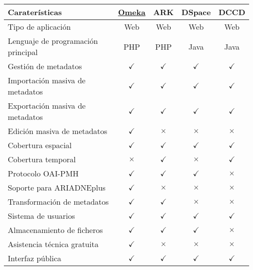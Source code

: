 \begin{table}[H]\label{tabla:comparativa}
\centering
\begin{tabular}{@{}lcccc@{}}
\toprule
Caraterísticas & \underline{Omeka} & ARK & DSpace & DCCD \tabularnewline
\midrule
Tipo de aplicación & Web & Web & Web & Web\tabularnewline
Lenguaje de programación principal & PHP & PHP & Java &
Java\tabularnewline
Gestión de metadatos & \cellcolor{green!25} {$\checkmark$} & \cellcolor{green!25} {$\checkmark$} & \cellcolor{green!25} {$\checkmark$} & \cellcolor{green!25} {$\checkmark$}\tabularnewline
Importación masiva de metadatos & \cellcolor{green!25} {$\checkmark$} & \cellcolor{green!25} {$\checkmark$} & \cellcolor{green!25} {$\checkmark$} & \cellcolor{green!25} {$\checkmark$}\tabularnewline
Exportación masiva de metadatos & \cellcolor{green!25} {$\checkmark$} & \cellcolor{green!25} {$\checkmark$} & \cellcolor{green!25} {$\checkmark$} & \cellcolor{green!25} {$\checkmark$}\tabularnewline
Edición masiva de metadatos & \cellcolor{green!25} {$\checkmark$} & \cellcolor{red!25} {$\times$} & \cellcolor{red!25} {$\times$} & \cellcolor{red!25} {$\times$}\tabularnewline
Cobertura espacial & \cellcolor{green!25} {$\checkmark$} & \cellcolor{green!25} {$\checkmark$} & \cellcolor{green!25} {$\checkmark$} & \cellcolor{green!25} {$\checkmark$}\tabularnewline
Cobertura temporal & \cellcolor{red!25} {$\times$} & \cellcolor{green!25} {$\checkmark$} & \cellcolor{red!25} {$\times$} & \cellcolor{green!25} {$\checkmark$}\tabularnewline
Protocolo OAI-PMH & \cellcolor{green!25} {$\checkmark$} & \cellcolor{green!25} {$\checkmark$} & \cellcolor{green!25} {$\checkmark$} & \cellcolor{red!25} {$\times$}\tabularnewline
Soporte para ARIADNEplus & \cellcolor{green!25} {$\checkmark$} & \cellcolor{red!25} {$\times$} & \cellcolor{red!25} {$\times$} &
\cellcolor{red!25} {$\times$}\tabularnewline
Transformación de metadatos & \cellcolor{green!25} {$\checkmark$} & \cellcolor{green!25} {$\checkmark$} & \cellcolor{red!25} {$\times$} &
\cellcolor{red!25} {$\times$}\tabularnewline
Sistema de usuarios & \cellcolor{green!25} {$\checkmark$} & \cellcolor{green!25} {$\checkmark$} & \cellcolor{green!25} {$\checkmark$} & \cellcolor{green!25} {$\checkmark$}\tabularnewline
Almacenamiento de ficheros & \cellcolor{green!25} {$\checkmark$} & \cellcolor{green!25} {$\checkmark$} & \cellcolor{green!25} {$\checkmark$} & \cellcolor{red!25} {$\times$}\tabularnewline
Asistencia técnica gratuita & \cellcolor{green!25} {$\checkmark$} & \cellcolor{red!25} {$\times$} & \cellcolor{red!25} {$\times$} & \cellcolor{red!25} {$\times$}\tabularnewline
Interfaz pública & \cellcolor{green!25} {$\checkmark$} & \cellcolor{green!25} {$\checkmark$} & \cellcolor{green!25} {$\checkmark$} & \cellcolor{green!25} {$\checkmark$}\tabularnewline

\end{tabular}
\end{table}

